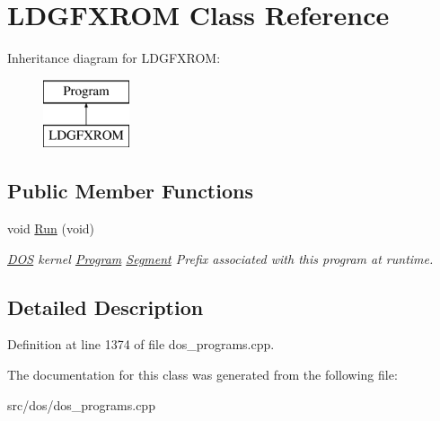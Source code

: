 \hypertarget{classLDGFXROM}{\section{L\-D\-G\-F\-X\-R\-O\-M Class Reference}
\label{classLDGFXROM}
}
Inheritance diagram for L\-D\-G\-F\-X\-R\-O\-M\-:\begin{figure}[H]
\begin{center}
\leavevmode
\includegraphics[height=2.000000cm]{classLDGFXROM}
\end{center}
\end{figure}
\subsection*{Public Member Functions}
\begin{DoxyCompactItemize}
\item 
\hypertarget{classLDGFXROM_aa4ee1bd38f082b0bb08d4fa9ed5f5626}{void \hyperlink{classLDGFXROM_aa4ee1bd38f082b0bb08d4fa9ed5f5626}{Run} (void)}\label{classLDGFXROM_aa4ee1bd38f082b0bb08d4fa9ed5f5626}

\begin{DoxyCompactList}\small\item\em \hyperlink{classDOS}{D\-O\-S} kernel \hyperlink{classProgram}{Program} \hyperlink{structSegment}{Segment} Prefix associated with this program at runtime. \end{DoxyCompactList}\end{DoxyCompactItemize}


\subsection{Detailed Description}


Definition at line 1374 of file dos\-\_\-programs.\-cpp.



The documentation for this class was generated from the following file\-:\begin{DoxyCompactItemize}
\item 
src/dos/dos\-\_\-programs.\-cpp\end{DoxyCompactItemize}
